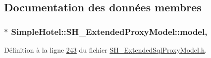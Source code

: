 \subsection{Documentation des données membres}
\hypertarget{classSimpleHotel_1_1SH__ExtendedProxyModel_ad31718ed4f13ecafcb53dbf1e392b3b0}{
\subsubsection[{model}]{$\ast$ Simple\-Hotel\-::\-S\-H\-\_\-\-Extended\-Proxy\-Model\-::model\hspace{0.3cm}{\ttfamily [protected]}, {\ttfamily [inherited]}}}\label{classSimpleHotel_1_1SH__ExtendedProxyModel_ad31718ed4f13ecafcb53dbf1e392b3b0}


Définition à la ligne \hyperlink{SH__ExtendedSqlProxyModel_8h_source_l00243}{243} du fichier \hyperlink{SH__ExtendedSqlProxyModel_8h_source}{S\-H\-\_\-\-Extended\-Sql\-Proxy\-Model.\-h}.



